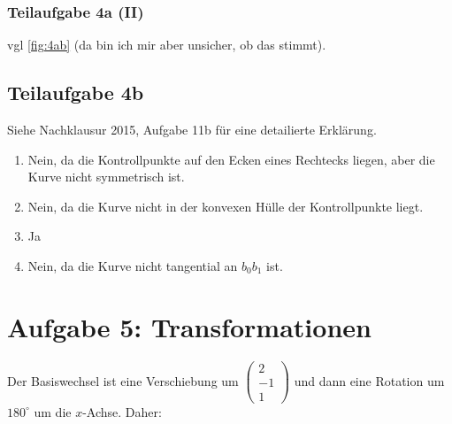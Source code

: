 \documentclass[a4paper]{scrartcl}
\begin{document}
\subsubsection*{Teilaufgabe 4a (II)}
vgl \cref{fig:4ab} (da bin ich mir aber unsicher, ob das stimmt).

\subsection*{Teilaufgabe 4b}
Siehe Nachklausur 2015, Aufgabe 11b für eine detailierte Erklärung.

\begin{enumerate}
    \item Nein, da die Kontrollpunkte auf den Ecken eines Rechtecks liegen,
          aber die Kurve nicht symmetrisch ist.
    \item Nein, da die Kurve nicht in der konvexen Hülle der Kontrollpunkte
          liegt.
    \item Ja
    \item Nein, da die Kurve nicht tangential an $b_0 b_1$ ist.
\end{enumerate}

\section*{Aufgabe 5: Transformationen}



Der Basiswechsel ist eine Verschiebung um $\begin{pmatrix}2\\-1\\1\end{pmatrix}$
und dann eine Rotation um $180^\circ$ um die $x$-Achse. Daher:
\end{document}
